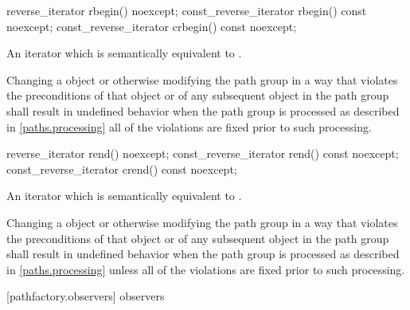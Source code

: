 \begin{itemdecl}
	reverse_iterator rbegin() noexcept;
	const_reverse_iterator rbegin() const noexcept;
	const_reverse_iterator crbegin() const noexcept;
\end{itemdecl}
\begin{itemdescr}
	\pnum
	\returns
	An iterator which is semantically equivalent to .
	
	\pnum
	\remarks
	Changing a  object or otherwise modifying the path group in a way that violates the preconditions of that  object or of any subsequent  object in the path group shall result in undefined behavior when the path group is processed as described in \ref{paths.processing} all of the violations are fixed prior to such processing.
\end{itemdescr}

\begin{itemdecl}
	reverse_iterator rend() noexcept;
	const_reverse_iterator rend() const noexcept;
	const_reverse_iterator crend() const noexcept;
\end{itemdecl}
\begin{itemdescr}
	\pnum
	\returns
	An iterator which is semantically equivalent to .
	
	\pnum
	\remarks
	Changing a  object or otherwise modifying the path group in a way that violates the preconditions of that  object or of any subsequent  object in the path group shall result in undefined behavior when the path group is processed as described in \ref{paths.processing} unless all of the violations are fixed prior to such processing.
\end{itemdescr}

 [pathfactory.observers] { observers}


